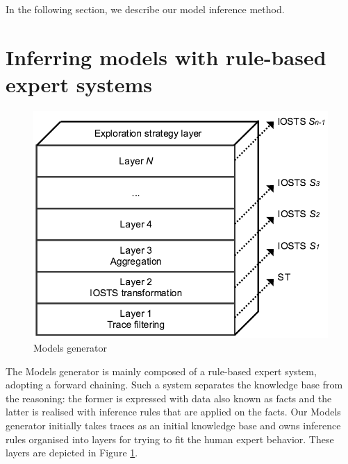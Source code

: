 In the following section, we describe our model inference method.


\section{Inferring models with rule-based expert systems}
\label{sec:modelinf:webapps:contrib}

\begin{figure}[ht]
    \begin{center}
        \includegraphics[width=1.0\linewidth]{figures/soict_se.png}
    \end{center}
    \caption {Models generator}

    \label{fig:se}
\end{figure}

The Models generator is mainly composed of a rule-based expert
system, adopting a forward chaining. Such a system separates the
knowledge base from the reasoning: the former is expressed with
data also known as facts and the latter is realised with
inference rules that are applied on the facts. Our Models
generator initially takes traces as an initial knowledge base and
owns inference rules organised into layers for trying to fit the
human expert behavior. These layers are depicted in Figure
\ref{fig:se}.


